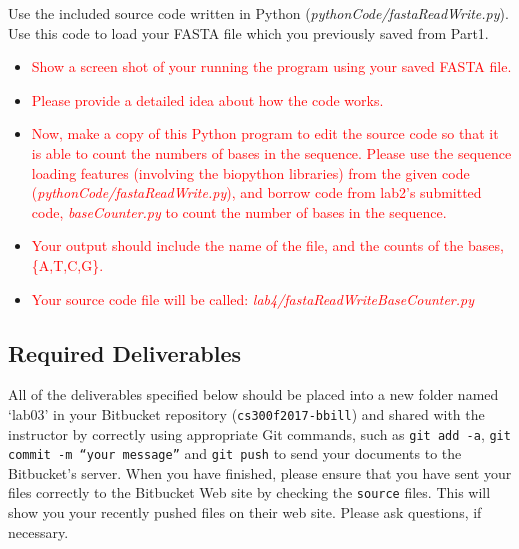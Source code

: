 Use the included source code written in Python (\emph{pythonCode/fastaReadWrite.py}). Use this code to load your FASTA file which you previously saved from Part1. 
\begin{itemize}
	\item \textcolor{red}{Show a screen shot of your running the program using your saved FASTA file.}
	\item \textcolor{red}{Please provide a detailed idea about how the code works. }
	\item \textcolor{red}{Now, make a copy of this Python program to edit the source code so that it is able to count the numbers of bases in the sequence. Please use the sequence loading features (involving the biopython libraries) from the given code (\emph{pythonCode/fastaReadWrite.py}), and borrow code from lab2's submitted code, \emph{baseCounter.py} to count the number of bases in the sequence. }
	\item \textcolor{red}{Your output should include the name of the file, and the counts of the bases, \{A,T,C,G\}.}
	\item \textcolor{red}{Your source code file will be called: \emph{lab4/fastaReadWriteBaseCounter.py}}
	
\end{itemize}




\vspace*{-.2in}
\subsection*{Required Deliverables}
\vspace*{-.1in}
All of the deliverables specified below should be placed into a new folder named `lab03' in your Bitbucket repository ({\tt cs300f2017-bbill})  and shared with the instructor by correctly using  appropriate Git commands, such as {\tt git add -a}, {\tt git commit -m ``your message''} and {\tt git push} to send your documents to the Bitbucket's server. When you have finished, please ensure that you have sent your files correctly to the Bitbucket Web site by checking the {\tt source} files. This will show you your recently pushed files on their web site. Please ask questions, if necessary.
\color{red}

